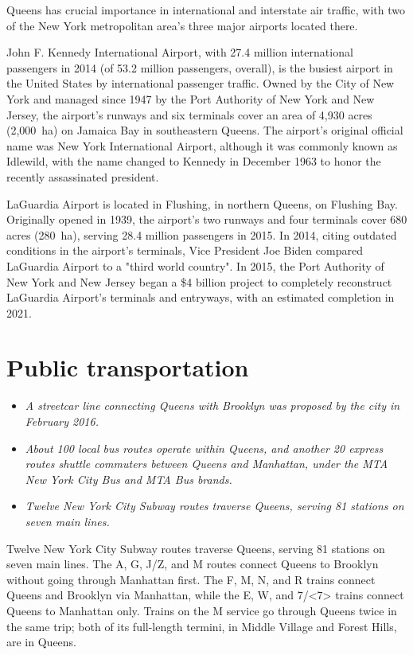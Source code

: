 Queens has crucial importance in international and interstate air
traffic, with two of the New York metropolitan area's three major
airports located there.

John F. Kennedy International Airport, with 27.4 million international
passengers in 2014 (of 53.2 million passengers, overall), is the busiest
airport in the United States by international passenger traffic. Owned
by the City of New York and managed since 1947 by the Port Authority of
New York and New Jersey, the airport's runways and six terminals cover
an area of 4,930 acres (2,000~ha) on Jamaica Bay in southeastern Queens.
The airport's original official name was New York International Airport,
although it was commonly known as Idlewild, with the name changed to
Kennedy in December 1963 to honor the recently assassinated president.

LaGuardia Airport is located in Flushing, in northern Queens, on
Flushing Bay. Originally opened in 1939, the airport's two runways and
four terminals cover 680 acres (280~ha), serving 28.4 million passengers
in 2015. In 2014, citing outdated conditions in the airport's terminals,
Vice President Joe Biden compared LaGuardia Airport to a "third world
country". In 2015, the Port Authority of New York and New Jersey began a
\$4 billion project to completely reconstruct LaGuardia Airport's
terminals and entryways, with an estimated completion in 2021.

\section{Public transportation}\label{public-transportation}

\begin{itemize}
\item
  \emph{A streetcar line connecting Queens with Brooklyn was proposed by
  the city in February 2016.}
\item
  \emph{About 100 local bus routes operate within Queens, and another 20
  express routes shuttle commuters between Queens and Manhattan, under
  the MTA New York City Bus and MTA Bus brands.}
\item
  \emph{Twelve New York City Subway routes traverse Queens, serving 81
  stations on seven main lines.}
\end{itemize}

Twelve New York City Subway routes traverse Queens, serving 81 stations
on seven main lines. The A, G, J/Z, and M routes connect Queens to
Brooklyn without going through Manhattan first. The F, M, N, and R
trains connect Queens and Brooklyn via Manhattan, while the E, W, and
7/\textless{}7\textgreater{} trains connect Queens to Manhattan only.
Trains on the M service go through Queens twice in the same trip; both
of its full-length termini, in Middle Village and Forest Hills, are in
Queens.

